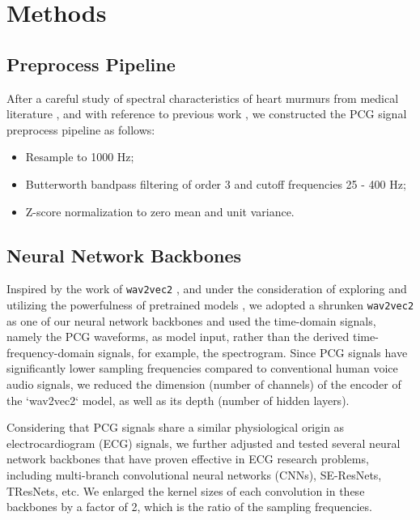 \section{Methods}
\label{sec:methods}

\subsection{Preprocess Pipeline}
\label{subsec:preproc}

After a careful study of spectral characteristics of heart murmurs from medical literature \cite{Donnerstein_1989, Noponen_2007}, and with reference to previous work \cite{Schmidt_2010}, we constructed the PCG signal preprocess pipeline as follows:
\begin{itemize}
    \item Resample to 1000 Hz;
    \item Butterworth bandpass filtering of order 3 and cutoff frequencies 25 - 400 Hz;
    \item Z-score normalization to zero mean and unit variance.
\end{itemize}

\subsection{Neural Network Backbones}
\label{subsec:nn}

Inspired by the work of \texttt{wav2vec2} \cite{baevski2020wav2vec}, and under the consideration of exploring and utilizing the powerfulness of pretrained models \cite{wolf-etal-2020-transformers}, we adopted a shrunken \texttt{wav2vec2} as one of our neural network backbones and used the time-domain signals, namely the PCG waveforms, as model input, rather than the derived time-frequency-domain signals, for example, the spectrogram. Since PCG signals have significantly lower sampling frequencies compared to conventional human voice audio signals, we reduced the dimension (number of channels) of the encoder of the `wav2vec2` model, as well as its depth (number of hidden layers).

Considering that PCG signals share a similar physiological origin as electrocardiogram (ECG) signals, we further adjusted and tested several neural network backbones \cite{Kang_2022_cinc2021_iop} that have proven effective in ECG research problems, including multi-branch convolutional neural networks (CNNs), SE-ResNets, TResNets, etc. We enlarged the kernel sizes of each convolution in these backbones by a factor of 2, which is the ratio of the sampling frequencies.

